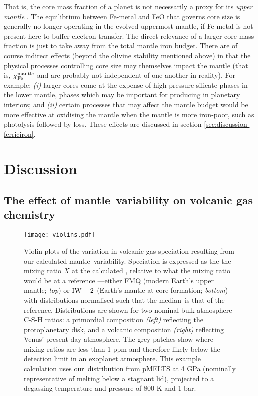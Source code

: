 That is, the core mass fraction of a planet is not necessarily a proxy for its \textit{upper mantle} \fo. The equilibrium between Fe-metal and FeO that governs core size is generally no longer operating in the evolved uppermost mantle, if Fe-metal is not present here to buffer electron transfer. The direct relevance of a larger core mass fraction is just to take away from the total mantle iron budget. There are of course indirect effects (beyond the olivine stability mentioned above) in that the physical processes controlling core size may themselves impact the mantle \xfer\;(that is, $\chi_{\rm Fe}^{\rm mantle}$ and \xfer\;are probably not independent of one another in reality). For example: \textit{(i)} larger cores come at the expense of high-pressure silicate phases in the lower mantle, phases which may be important for producing \ferric\;in planetary interiors; and \textit{(ii)} certain processes that may affect the mantle \ferric\;budget would be more effective at oxidising the mantle when the mantle is more iron-poor, such as  photolysis followed by  loss. These effects are discussed in section \ref{sec:discussion-ferriciron}.



\section{Discussion}
\label{sec:discussion}


\subsection{The effect of mantle \fo\,variability on volcanic gas chemistry}



\begin{figure*}
\centering
\texttt{[image: violins.pdf]}
\caption[The variability of volcanic gas mixing ratios, or molar concentrations, which are a direct result of the calculated variability of exoplanet mantle \fo.]{\label{fig:speciation}Violin plots of the variation in volcanic gas speciation resulting from our calculated mantle \fo\,variability. Speciation is expressed as the the mixing ratio $X$ at the calculated \fo, relative to what the mixing ratio would be at a reference \fo---either FMQ (modern Earth's upper mantle; \textit{top}) or ${\rm IW} - 2$ (Earth's mantle at core formation; \textit{bottom})---with distributions normalised such that the median \fo\,is that of the reference. Distributions are shown for two nominal bulk atmosphere C-S-H ratios: a primordial composition \textit{(left)} reflecting the protoplanetary disk, and a volcanic composition \textit{(right)} reflecting Venus' present-day atmosphere. The grey patches show where mixing ratios are less than 1 ppm and therefore likely below the detection limit in an exoplanet atmosphere. This example calculation uses our \fo\,distribution from pMELTS at 4 GPa (nominally representative of melting below a stagnant lid), projected to a degassing temperature and pressure of 800 K and 1 bar.}
\end{figure*}


